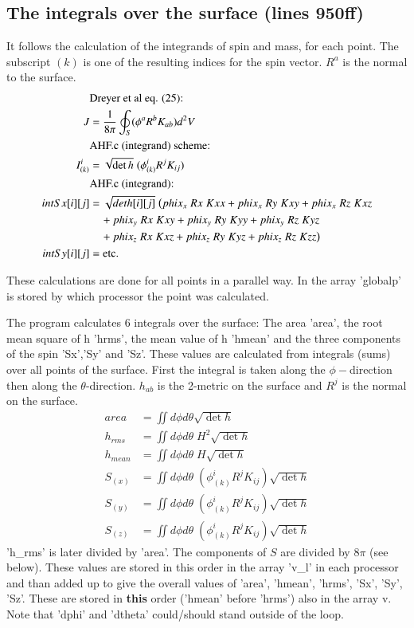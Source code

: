 \documentclass[11pt,a4paper,twoside]{article}
\begin{document}
\subsection{The integrals over the surface (lines 950ff)}
It follows the calculation of the integrands of spin and mass, for each point.
The subscript $(k)$ is one of the resulting indices for the spin vector.
$R^a$ is the normal to the surface.
\begin{align}
  &\text{Dreyer et al eq. (25):}\\
  J &= \frac 1 {8\pi} \oint_S (\phi^a R^b K_{ab}) d^2 V\\
  &\text{AHF.c (integrand) scheme:}\\
  I_{(k)}^i &= \sqrt{\det h}\;(\phi_{(k)}^i R^j K_{ij})\\
  &\text{AHF.c (integrand):}\\
  intSx[i][j] &=\sqrt{deth[i][j]} \;\big(
            phix_x\;Rx\;Kxx + phix_x\;Ry\;Kxy + phix_x\;Rz\;Kxz \notag\\
  &\quad  + phix_y\;Rx\;Kxy + phix_y\;Ry\;Kyy + phix_y\;Rz\;Kyz \notag\\
  &\quad  + phix_z\;Rx\;Kxz + phix_z\;Ry\;Kyz + phix_z\;Rz\;Kzz \big) \\
  intSy[i][j] &= \text{etc.}
\end{align}

These calculations are done for all points in a parallel way. In the array
'globalp' is stored by which processor the point was calculated.

The program calculates 6 integrals over the surface: The area 'area', the
root mean square of h 'hrms', the mean value of h 'hmean' and the
three components of the spin 'Sx','Sy' and 'Sz'.
These values are calculated from integrals (sums) over all points
of the surface. First the integral is taken along the $\phi-$direction
then along the $\theta$-direction. $h_{ab}$ is the 2-metric on the surface and
$R^j$ is the normal on the surface.
\begin{align}
  area &=    \iint d\phi d\theta \sqrt{\det h}  \\
  h_{rms} &= \iint d\phi d\theta \;H^2 \sqrt{\det h}  \\
  h_{mean} &=\iint d\phi d\theta \;H \sqrt{\det h} \\
  S_{(x)} &= \iint d\phi d\theta \;(\phi_{(k)}^i R^j K_{ij}) \sqrt{\det h} \\
  S_{(y)} &= \iint d\phi d\theta \;(\phi_{(k)}^i R^j K_{ij}) \sqrt{\det h} \\
  S_{(z)} &= \iint d\phi d\theta \;(\phi_{(k)}^i R^j K_{ij}) \sqrt{\det h}
\end{align}
'h\_rms' is later divided by 'area'. The components of $S$ are divided by $8 \pi$
(see below).
These values are stored in this order in the array 'v\_l' in each processor
and than added up to give the overall values of 'area', 'hmean', 'hrms', 
'Sx', 'Sy', 'Sz'. These are stored in \textbf{this} order ('hmean' before 
'hrms') also in the array v.
Note that 'dphi' and 'dtheta' could/should stand outside of the loop.
\end{document}
